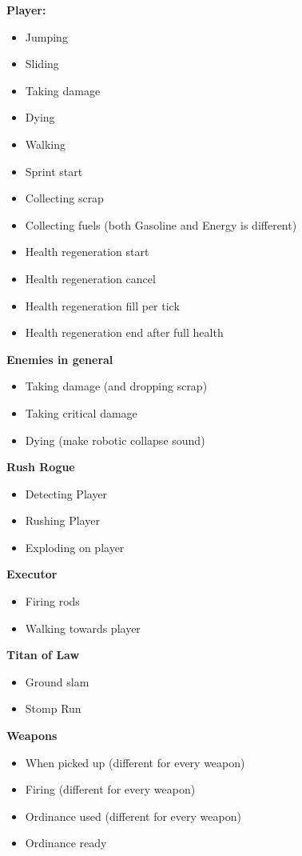 \documentclass[../Main.tex]{subfiles}
\begin{document}
\textbf{Player:}
\begin{itemize}
	\item Jumping
	\item Sliding
	\item Taking damage
	\item Dying
	\item Walking
	\item Sprint start
	\item Collecting scrap
	\item Collecting fuels (both Gasoline and Energy is different)
	\item Health regeneration start
	\item Health regeneration cancel
	\item Health regeneration fill per tick
	\item Health regeneration end after full health
\end{itemize}

\textbf{Enemies in general}
\begin{itemize}
	\item Taking damage (and dropping scrap)
	\item Taking critical damage
	\item Dying (make robotic collapse sound)
\end{itemize}

\textbf{Rush Rogue}
\begin{itemize}
	\item Detecting Player
	\item Rushing Player
	\item Exploding on player
\end{itemize}

\textbf{Executor}
\begin{itemize}
	\item Firing rods
	\item Walking towards player
\end{itemize}

\textbf{Titan of Law}
\begin{itemize}
	\item Ground slam
	\item Stomp Run
\end{itemize}

\textbf{Weapons}
\begin{itemize}
	\item When picked up (different for every weapon)
	\item Firing (different for every weapon)
	\item Ordinance used (different for every weapon)
	\item Ordinance ready
\end{itemize}
\end{document}
